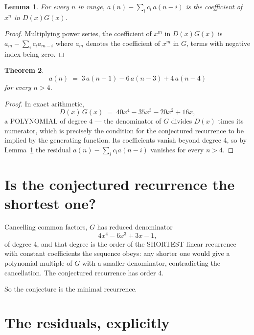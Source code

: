 \documentclass[11pt,a4paper]{article}
\theoremstyle{plain}
\newtheorem{theorem}{Theorem}
\newtheorem{lemma}[theorem]{Lemma}
\theoremstyle{definition}
\begin{document}
\begin{lemma}\label{lem:key}
For every $n$ in range, $a(n)-\sum_i c_i\,a(n-i)$ is the coefficient of $x^{n}$ in
$D(x)G(x)$.
\end{lemma}

\begin{proof}
Multiplying power series, the coefficient of $x^{m}$ in $D(x)G(x)$ is
$a_m-\sum_i c_i a_{m-i}$ where $a_m$ denotes the coefficient of $x^{m}$ in $G$, terms with
negative index being zero.
\end{proof}

\begin{theorem}
\[
a(n)\;=\;3\,a(n-1) - 6\,a(n-3) + 4\,a(n-4)
\]
for every $n>4$.
\end{theorem}

\begin{proof}
In exact arithmetic,
\[
D(x)\,G(x)\;=\;40 x^{4} - 35 x^{3} - 20 x^{2} + 16 x,
\]
a POLYNOMIAL of degree $4$ --- the denominator of $G$ divides $D(x)$ times its numerator,
which is precisely the condition for the conjectured recurrence to be implied by the
generating function. Its coefficients vanish beyond degree $4$, so by
Lemma~\ref{lem:key} the residual $a(n)-\sum_ic_ia(n-i)$ vanishes for every
$n>4$.
\end{proof}

\section{Is the conjectured recurrence the shortest one?}

Cancelling common factors, $G$ has reduced denominator
\[
4 x^{4} - 6 x^{3} + 3 x - 1,
\]
of degree $4$, and that degree is the order of the SHORTEST linear recurrence with
constant coefficients the sequence obeys: any shorter one would give a polynomial multiple of
$G$ with a smaller denominator, contradicting the cancellation. The conjectured recurrence has
order $4$.

So the conjecture is the minimal recurrence.

\section{The residuals, explicitly}
\end{document}
